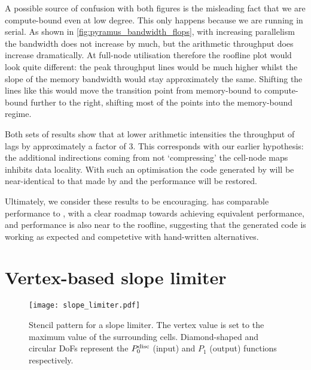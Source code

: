 \documentclass[thesis]{subfiles}
\begin{document}
A possible source of confusion with both figures is the misleading fact that we are compute-bound even at low degree.
This only happens because we are running in serial.
As shown in \cref{fig:pyramus_bandwidth_flops}, with increasing parallelism the bandwidth does not increase by much, but the arithmetic throughput does increase dramatically.
At full-node utilisation therefore the roofline plot would look quite different: the peak throughput lines would be much higher whilst the slope of the memory bandwidth would stay approximately the same.
Shifting the lines like this would move the transition point from memory-bound to compute-bound further to the right, shifting most of the points into the memory-bound regime.

Both sets of results show that at lower arithmetic intensities the throughput of  lags  by approximately a factor of 3.
This corresponds with our earlier hypothesis: the additional indirections coming from not `compressing' the cell-node maps inhibits data locality.
With such an optimisation the code generated by  will be near-identical to that made by  and the performance will be restored.

Ultimately, we consider these results to be encouraging.
 has comparable performance to , with a clear roadmap towards achieving equivalent performance, and performance is also near to the roofline, suggesting that the generated code is working as expected and competetive with hand-written alternatives.

\section{Vertex-based slope limiter}
\label{sec:demo_apps_slope_limiter}

\begin{figure}
  \centering
  \texttt{[image: slope\_limiter.pdf]}
  \caption{
    Stencil pattern for a slope limiter.
    The vertex value is set to the maximum value of the surrounding cells.
    Diamond-shaped and circular DoFs represent the $P_0^\textnormal{disc}$ (input) and $P_1$ (output) functions respectively.
  }
  \label{fig:slope_limiter_stencil}
\end{figure}
\end{document}
